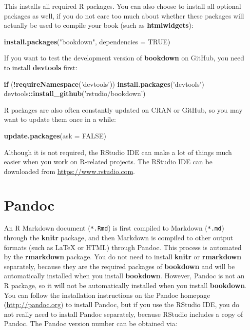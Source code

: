 \documentclass[12pt,]{krantz}
\makeatletter
\newenvironment{Shaded}{\begin{snugshade}}{\end{snugshade}}
\newcommand{\KeywordTok}[1]{\textcolor[rgb]{0.13,0.29,0.53}{\textbf{#1}}}
\newcommand{\DataTypeTok}[1]{\textcolor[rgb]{0.13,0.29,0.53}{#1}}
\newcommand{\StringTok}[1]{\textcolor[rgb]{0.31,0.60,0.02}{#1}}
\newcommand{\OtherTok}[1]{\textcolor[rgb]{0.56,0.35,0.01}{#1}}
\newcommand{\ControlFlowTok}[1]{\textcolor[rgb]{0.13,0.29,0.53}{\textbf{#1}}}
\newcommand{\OperatorTok}[1]{\textcolor[rgb]{0.81,0.36,0.00}{\textbf{#1}}}
\newcommand{\NormalTok}[1]{#1}
\newenvironment{kframe}{%
\medskip{}
\setlength{\fboxsep}{.8em}
 \def\at@end@of@kframe{}%
 \ifinner\ifhmode%
  \def\at@end@of@kframe{\end{minipage}}%
  \begin{minipage}{\columnwidth}%
 \fi\fi%
 \def\FrameCommand##1{\hskip\@totalleftmargin \hskip-\fboxsep
 \colorbox{shadecolor}{##1}\hskip-\fboxsep
     \hskip-\linewidth \hskip-\@totalleftmargin \hskip\columnwidth}%
 \MakeFramed {\advance\hsize-\width
   \@totalleftmargin\z@ \linewidth\hsize
   \@setminipage}}%
 {\par\unskip\endMakeFramed%
 \at@end@of@kframe}
\renewenvironment{Shaded}{\begin{kframe}}{\end{kframe}}
\theoremstyle{definition}
\theoremstyle{definition}
\theoremstyle{definition}
\theoremstyle{remark}
\makeatother
\begin{document}
This installs all required R packages. You can also choose to install
all optional packages as well, if you do not care too much about whether
these packages will actually be used to compile your book (such as
\textbf{htmlwidgets}):

\begin{Shaded}
\begin{Highlighting}[]
\KeywordTok{install.packages}\NormalTok{(}\StringTok{"bookdown"}\NormalTok{, }\DataTypeTok{dependencies =} \OtherTok{TRUE}\NormalTok{)}
\end{Highlighting}
\end{Shaded}

If you want to test the development version of \textbf{bookdown} on
GitHub, you need to install \textbf{devtools} first:

\begin{Shaded}
\begin{Highlighting}[]
\ControlFlowTok{if}\NormalTok{ (}\OperatorTok{!}\KeywordTok{requireNamespace}\NormalTok{(}\StringTok{'devtools'}\NormalTok{)) }\KeywordTok{install.packages}\NormalTok{(}\StringTok{'devtools'}\NormalTok{)}
\NormalTok{devtools}\OperatorTok{::}\KeywordTok{install_github}\NormalTok{(}\StringTok{'rstudio/bookdown'}\NormalTok{)}
\end{Highlighting}
\end{Shaded}

R packages are also often constantly updated on CRAN or GitHub, so you
may want to update them once in a while:

\begin{Shaded}
\begin{Highlighting}[]
\KeywordTok{update.packages}\NormalTok{(}\DataTypeTok{ask =} \OtherTok{FALSE}\NormalTok{)}
\end{Highlighting}
\end{Shaded}

Although it is not required, the RStudio IDE can make a lot of things
much easier when you work on R-related projects. The RStudio IDE can be
downloaded from \url{https://www.rstudio.com}.

\section{Pandoc}\label{pandoc}

An R Markdown document (\texttt{*.Rmd}) is first compiled to Markdown
(\texttt{*.md}) through the \textbf{knitr} package, and then Markdown is
compiled to other output formats (such as LaTeX or HTML) through
Pandoc. This process is automated by the
\textbf{rmarkdown} package. You do not need to install \textbf{knitr} or
\textbf{rmarkdown} separately, because they are the required packages of
\textbf{bookdown} and will be automatically installed when you install
\textbf{bookdown}. However, Pandoc is not an R package, so it will not
be automatically installed when you install \textbf{bookdown}. You can
follow the installation instructions on the Pandoc homepage
(\url{http://pandoc.org}) to install Pandoc, but if you use the RStudio
IDE, you do not really need to install Pandoc separately, because
RStudio includes a copy of Pandoc. The Pandoc version number can be
obtained via:
\end{document}
